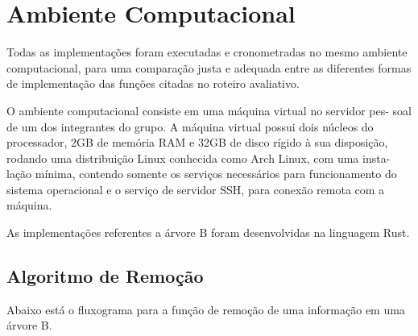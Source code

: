 \section{Ambiente Computacional}

Todas as implementações foram executadas e cronometradas no 
mesmo ambiente computacional, para uma comparação justa e 
adequada entre as diferentes formas de implementação das 
funções citadas no roteiro avaliativo.

O ambiente computacional consiste em uma máquina virtual no servidor pes-
soal de um dos integrantes do grupo. A máquina virtual possui dois núcleos do
processador, 2GB de memória RAM e 32GB de disco rígido à sua disposição,
rodando uma distribuição Linux conhecida como Arch Linux, com uma insta-
lação mínima, contendo somente os serviços necessários para funcionamento do
sistema operacional e o serviço de servidor SSH, para conexão remota com a
máquina.

As implementações referentes a árvore B foram desenvolvidas na linguagem Rust.

\subsection{Algoritmo de Remoção}

Abaixo está o fluxograma para a função de remoção de uma informação em uma árvore B.
